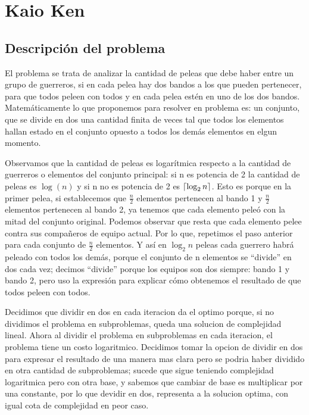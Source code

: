\documentclass[10pt,a4paper]{article}
\DeclarePairedDelimiter\ceil{\lceil}{\rceil}
\begin{document}

\section{Kaio Ken}

\subsection{Descripción del problema}
\par{El problema se trata de analizar la cantidad de peleas que debe haber entre un grupo de guerreros, si en cada pelea hay dos bandos a los que pueden pertenecer, para que todos peleen con todos y en cada pelea estén en uno de los dos bandos. Matemáticamente lo que proponemos para resolver en problema es: un conjunto, que se divide en dos una cantidad finita de veces tal que todos los elementos hallan estado en el conjunto opuesto a todos los demás elementos en elgun momento.}
\par{Observamos que la cantidad de peleas es logarítmica respecto a la cantidad de guerreros o elementos del conjunto principal: si n es potencia de 2 la cantidad de peleas es $\log(n)$ y si n no es potencia de 2 es $\ceil*{\log_2 n}$. Esto es porque en la primer pelea, si establecemos que $\frac{n}{2}$ elementos pertenecen al bando 1 y $\frac{n}{2}$ elementos pertenecen al bando 2, ya tenemos que cada elemento peleó con la mitad del conjunto original. Podemos observar que resta que cada elemento pelee contra sus compañeros de equipo actual. Por lo que, repetimos el paso anterior para cada conjunto de $\frac{n}{2}$ elementos. Y así en $\log_2 n$ peleas cada guerrero habrá peleado con todos los demás, porque el conjunto de n elementos se “divide” en dos cada vez; decimos “divide” porque los equipos son dos siempre: bando 1 y bando 2, pero uso la expresión para explicar cómo obtenemos el resultado de que todos peleen con todos.}
\par{Decidimos que dividir en dos en cada iteracion da el optimo porque, si no dividimos el problema en subproblemas, queda una solucion de complejidad lineal. Ahora al dividir el problema en subproblemas en cada iteracion, el problema tiene un costo logaritmico. Decidimos tomar la opcion de dividir en dos para expresar el resultado de una manera mas clara pero se podria haber dividido en otra cantidad de subproblemas; sucede que sigue teniendo complejidad logaritmica pero con otra base, y sabemos que cambiar de base es multiplicar por una constante, por lo que devidir en dos, representa a la solucion optima, con igual cota de complejidad en peor caso.}
\end{document}
